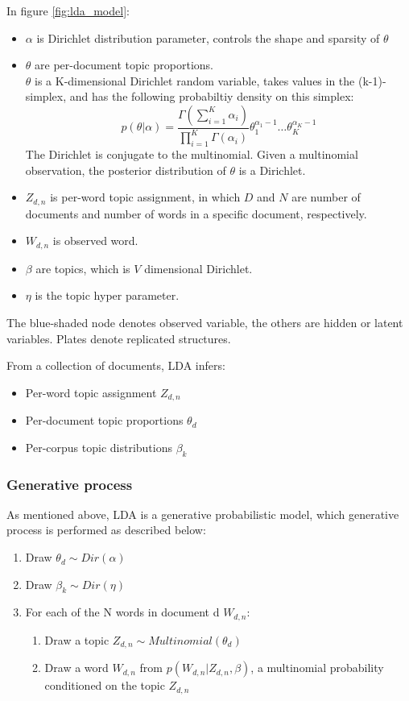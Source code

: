 \documentclass[conference,compsoc]{IEEEtran}
\begin{document}
In figure \ref{fig:lda_model}:
\begin{itemize}
	\item $\alpha$ is Dirichlet distribution parameter, controls the shape and sparsity of $\theta$
	\item $\theta$ are per-document topic proportions.\\
		$\theta$ is a K-dimensional Dirichlet random variable, takes values in the (k-1)-simplex, and has the following probabiltiy density on this simplex:
		\[p(\theta|\alpha)=\frac{\Gamma(\sum_{i=1}^{K}\alpha_i)}{\prod_{i=1}^{K}\Gamma(\alpha_i)}\theta_1^{\alpha_1-1}\dots\theta_K^{\alpha_K-1}\]
		The Dirichlet is conjugate to the multinomial. Given a multinomial observation, the posterior distribution of $\theta$ is a Dirichlet.
	\item $Z_{d,n}$ is per-word topic assignment, in which $D$ and $N$ are number of documents and number of words in a specific document, respectively.
	\item $W_{d,n}$ is observed word.
	\item $\beta$ are topics, which is $V$ dimensional Dirichlet.
	\item $\eta$ is the topic hyper parameter.
\end{itemize}

The blue-shaded node denotes observed variable, the others are hidden or latent variables. Plates denote replicated structures.

 From a collection of documents, LDA infers:
 \begin{itemize}
 	\item Per-word topic assignment $Z_{d,n}$
 	\item Per-document topic proportions $\theta_d$
 	\item Per-corpus topic distributions $\beta_k$
 \end{itemize}

\subsubsection{Generative process}

As mentioned above, LDA is a generative probabilistic model, which generative process is performed as described below:
\begin{enumerate}
	\item Draw $\theta_d \sim Dir(\alpha)$
	\item Draw $\beta_k \sim Dir(\eta)$
	\item For each of the N words in document d $W_{d,n}$:
		\begin{enumerate}
			\item Draw a topic $Z_{d,n} \sim Multinomial(\theta_d)$
			\item Draw a word $W_{d,n}$ from $p(W_{d,n}|Z_{d,n},\beta)$, a multinomial probability conditioned on the topic $Z_{d,n}$
		\end{enumerate}
\end{enumerate}
\end{document}
